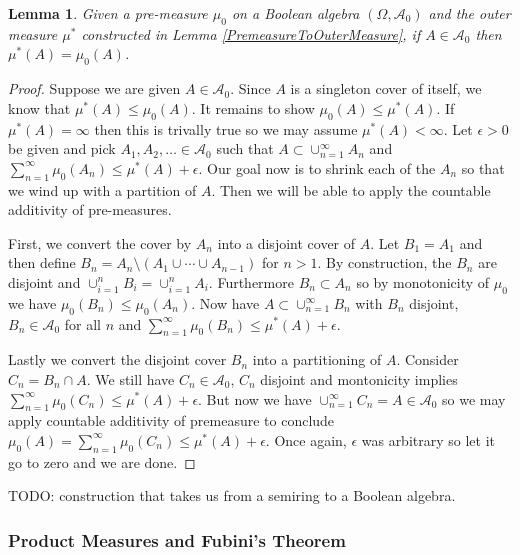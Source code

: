 \documentclass{amsart}
\newtheorem{lem}[thm]{Lemma}
\theoremstyle{remark}
\theoremstyle{definition}
\begin{document}
\begin{lem}\label{PremeasureOuterMeasureEqual}Given a pre-measure $\mu_0$ on a Boolean algebra $(\Omega,
  \mathcal{A}_0)$ and the outer measure $\mu^*$ constructed in Lemma
  \ref{PremeasureToOuterMeasure}, if $A \in \mathcal{A}_0$ then $\mu^*(A)=\mu_0(A)$.
\end{lem}
\begin{proof}
Suppose we are given $A \in \mathcal{A}_0$.  Since $A$ is a singleton
cover of itself, we know that $\mu^*(A) \leq \mu_0(A)$.  It remains to
show $\mu_0(A) \leq \mu^*(A)$.  If $\mu^*(A) =\infty$ then this is
trivally true so we may assume $\mu^*(A) < \infty$.  Let $\epsilon
>0$ be given and pick $A_1, A_2, \dotsc \in \mathcal{A}_0$ such that
$A \subset \cup_{n=1}^\infty A_n$ and 
$\sum_{n=1}^\infty \mu_0(A_n) \leq \mu^*(A) + \epsilon$.  Our goal now
is to shrink each of the $A_n$ so that we wind up with a partition of
$A$.  Then we will be able to apply the countable additivity of pre-measures.

First, we convert the cover by $A_n$ into a disjoint cover of $A$.  Let
$B_1 = A_1$ and then define $B_n = A_n \setminus (A_1 \cup \cdots \cup
A_{n-1})$ for $n>1$.
By construction, the $B_n$ are disjoint and $\cup_{i=1}^n B_i =
\cup_{i=1}^n A_i$.  Furthermore $B_n \subset A_n$ so by monotonicity
of $\mu_0$ we have $\mu_0(B_n) \leq \mu_0(A_n)$.  Now have $A \subset
\cup_{n=1}^\infty B_n$ with $B_n$ disjoint, $B_n \in \mathcal{A}_0$
for all $n$  and $\sum_{n=1}^\infty
\mu_0(B_n) \leq \mu^*(A) + \epsilon$.  

Lastly we convert the disjoint cover $B_n$ into a partitioning of $A$.  
Consider $C_n = B_n \cap A$.  We still have $C_n \in
\mathcal{A}_0$, $C_n$ disjoint and montonicity implies $\sum_{n=1}^\infty
\mu_0(C_n) \leq \mu^*(A) + \epsilon$.  But now we have
$\cup_{n=1}^\infty C_n = A \in \mathcal{A}_0$ so we may apply
countable additivity of premeasure to conclude $\mu_0(A) = \sum_{n=1}^\infty
\mu_0(C_n) \leq \mu^*(A) + \epsilon$.  Once again, $\epsilon$ was
arbitrary so let it go to zero and we are done.
\end{proof}


TODO: construction that takes us from a semiring to a Boolean algebra.

\subsubsection{Product Measures and Fubini's Theorem}
\end{document}
